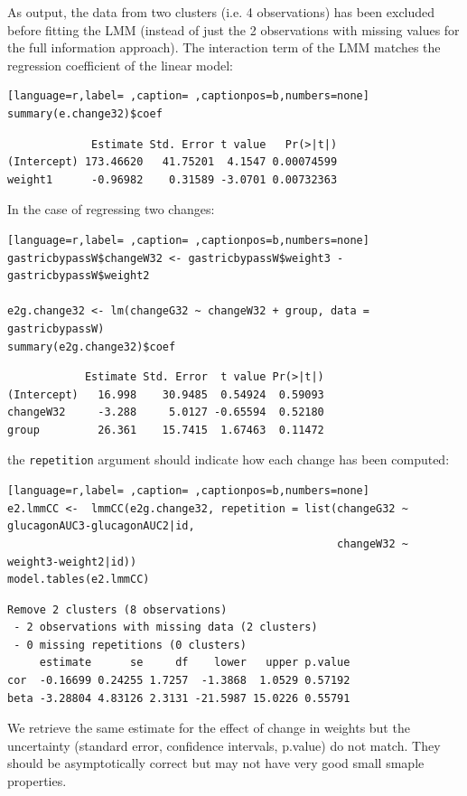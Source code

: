 \documentclass[12pt]{article}
\begin{document}
As output, the data from two clusters (i.e. 4 observations) has been
excluded before fitting the LMM (instead of just the 2 observations
with missing values for the full information approach). The
interaction term of the LMM matches the regression coefficient of the
linear model:
\begin{lstlisting}[language=r,label= ,caption= ,captionpos=b,numbers=none]
summary(e.change32)$coef
\end{lstlisting}

\begin{verbatim}
             Estimate Std. Error t value   Pr(>|t|)
(Intercept) 173.46620   41.75201  4.1547 0.00074599
weight1      -0.96982    0.31589 -3.0701 0.00732363
\end{verbatim}


In the case of regressing two changes:
\begin{lstlisting}[language=r,label= ,caption= ,captionpos=b,numbers=none]
gastricbypassW$changeW32 <- gastricbypassW$weight3 - gastricbypassW$weight2

e2g.change32 <- lm(changeG32 ~ changeW32 + group, data = gastricbypassW)
summary(e2g.change32)$coef
\end{lstlisting}

\begin{verbatim}
            Estimate Std. Error  t value Pr(>|t|)
(Intercept)   16.998    30.9485  0.54924  0.59093
changeW32     -3.288     5.0127 -0.65594  0.52180
group         26.361    15.7415  1.67463  0.11472
\end{verbatim}


the \texttt{repetition} argument should indicate how each change has
been computed:
\begin{lstlisting}[language=r,label= ,caption= ,captionpos=b,numbers=none]
e2.lmmCC <-  lmmCC(e2g.change32, repetition = list(changeG32 ~ glucagonAUC3-glucagonAUC2|id,
                                                   changeW32 ~ weight3-weight2|id))
model.tables(e2.lmmCC)
\end{lstlisting}

\begin{verbatim}
Remove 2 clusters (8 observations) 
 - 2 observations with missing data (2 clusters) 
 - 0 missing repetitions (0 clusters)
     estimate      se     df    lower   upper p.value
cor  -0.16699 0.24255 1.7257  -1.3868  1.0529 0.57192
beta -3.28804 4.83126 2.3131 -21.5987 15.0226 0.55791
\end{verbatim}


We retrieve the same estimate for the effect of change in weights but
the uncertainty (standard error, confidence intervals, p.value) do not
match. They should be asymptotically correct but may not have very
good small smaple properties.
\end{document}
